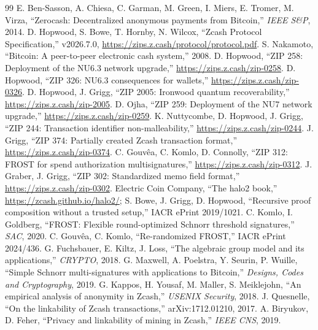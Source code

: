 \documentclass[10pt,letterpaper]{article}
\theoremstyle{plain}
\theoremstyle{definition}
\begin{document}
\renewcommand{\refname}{References}
\begin{thebibliography}{99}\small\setlength\itemsep{0.05em}
 E. Ben-Sasson, A. Chiesa, C. Garman, M. Green, I. Miers, E. Tromer, M. Virza, ``Zerocash: Decentralized anonymous payments from Bitcoin,'' \emph{IEEE S\&P}, 2014.
 D. Hopwood, S. Bowe, T. Hornby, N. Wilcox, ``Zcash Protocol Specification,'' v2026.7.0, \url{https://zips.z.cash/protocol/protocol.pdf}.
 S. Nakamoto, ``Bitcoin: A peer-to-peer electronic cash system,'' 2008.
 D. Hopwood, ``ZIP 258: Deployment of the NU6.3 network upgrade,'' \url{https://zips.z.cash/zip-0258}.
 D. Hopwood, ``ZIP 326: NU6.3 consequences for wallets,'' \url{https://zips.z.cash/zip-0326}.
 D. Hopwood, J. Grigg, ``ZIP 2005: Ironwood quantum recoverability,'' \url{https://zips.z.cash/zip-2005}.
 D. Ojha, ``ZIP 259: Deployment of the NU7 network upgrade,'' \url{https://zips.z.cash/zip-0259}.
 K. Nuttycombe, D. Hopwood, J. Grigg, ``ZIP 244: Transaction identifier non-malleability,'' \url{https://zips.z.cash/zip-0244}.
 J. Grigg, ``ZIP 374: Partially created Zcash transaction format,'' \url{https://zips.z.cash/zip-0374}.
 C. Gouv\^{e}a, C. Komlo, D. Connolly, ``ZIP 312: FROST for spend authorization multisignatures,'' \url{https://zips.z.cash/zip-0312}.
 J. Graber, J. Grigg, ``ZIP 302: Standardized memo field format,'' \url{https://zips.z.cash/zip-0302}.
 Electric Coin Company, ``The halo2 book,'' \url{https://zcash.github.io/halo2/}; S. Bowe, J. Grigg, D. Hopwood, ``Recursive proof composition without a trusted setup,'' IACR ePrint 2019/1021.
 C. Komlo, I. Goldberg, ``FROST: Flexible round-optimized Schnorr threshold signatures,'' \emph{SAC}, 2020.
 C. Gouv\^{e}a, C. Komlo, ``Re-randomized FROST,'' IACR ePrint 2024/436.
 G. Fuchsbauer, E. Kiltz, J. Loss, ``The algebraic group model and its applications,'' \emph{CRYPTO}, 2018.
 G. Maxwell, A. Poelstra, Y. Seurin, P. Wuille, ``Simple Schnorr multi-signatures with applications to Bitcoin,'' \emph{Designs, Codes and Cryptography}, 2019.
 G. Kappos, H. Yousaf, M. Maller, S. Meiklejohn, ``An empirical analysis of anonymity in Zcash,'' \emph{USENIX Security}, 2018.
 J. Quesnelle, ``On the linkability of Zcash transactions,'' arXiv:1712.01210, 2017.
 A. Biryukov, D. Feher, ``Privacy and linkability of mining in Zcash,'' \emph{IEEE CNS}, 2019.

\end{thebibliography}
\end{document}
